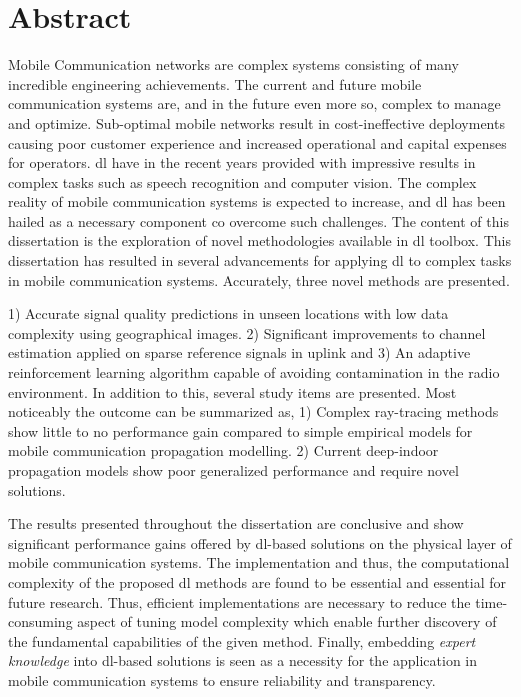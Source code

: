 \chapter*{Abstract}
Mobile Communication networks are complex systems consisting of many incredible engineering achievements. The current and future mobile communication systems are, and in the future even more so, complex to manage and optimize. Sub-optimal mobile networks result in cost-ineffective deployments causing poor customer experience and increased operational and capital expenses for operators. \acrfull{dl} have in the recent years provided with impressive results in complex tasks such as speech recognition and computer vision. The complex reality of mobile communication systems is expected to increase, and \acrlong{dl} has been hailed as a necessary component co overcome such challenges. The content of this dissertation is the exploration of novel methodologies available in \acrlong{dl} toolbox. This dissertation has resulted in several advancements for applying \acrlong{dl} to complex tasks in mobile communication systems. Accurately, three novel methods are presented. 

1) Accurate signal quality predictions in unseen locations with low data complexity using geographical images. 2) Significant improvements to channel estimation applied on sparse reference signals in uplink and 3) An adaptive reinforcement learning algorithm capable of avoiding contamination in the radio environment. In addition to this, several study items are presented. Most noticeably the outcome can be summarized as, 1) Complex ray-tracing methods show little to no performance gain compared to simple empirical models for mobile communication propagation modelling. 2) Current deep-indoor propagation models show poor generalized performance and require novel solutions.

The results presented throughout the dissertation are conclusive and show significant performance gains offered by \acrlong{dl}-based solutions on the physical layer of mobile communication systems. The implementation and thus, the computational complexity of the proposed \acrlong{dl} methods are found to be essential and essential for future research. Thus, efficient implementations are necessary to reduce the time-consuming aspect of tuning model complexity which enable further discovery of the fundamental capabilities of the given method. Finally, embedding \emph{expert knowledge} into \acrlong{dl}-based solutions is seen as a necessity for the application in mobile communication systems to ensure reliability and transparency.